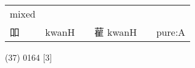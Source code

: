 \documentclass[14pt,a4paper]{scrartcl}
\begin{document}
\begin{longtable}[c]{@{}llllll@{}}
\begin{minipage}[t]{0.14\columnwidth}
mixed
\strut\end{minipage}\tabularnewline
\begin{minipage}[t]{0.14\columnwidth}\raggedright\strut
吅
\strut\end{minipage} &
\begin{minipage}[t]{0.14\columnwidth}\raggedright\strut
kwanH
\strut\end{minipage} &
\begin{minipage}[t]{0.14\columnwidth}\raggedright\strut
\strut\end{minipage} &
\begin{minipage}[t]{0.14\columnwidth}\raggedright\strut
雚 kwanH
\strut\end{minipage} &
\begin{minipage}[t]{0.14\columnwidth}\raggedright\strut
\strut\end{minipage} &
\begin{minipage}[t]{0.14\columnwidth}\raggedright\strut
pure:A
\strut\end{minipage}\tabularnewline
\bottomrule
\end{longtable}

(37) 0164 {[}3{]}
\end{document}
